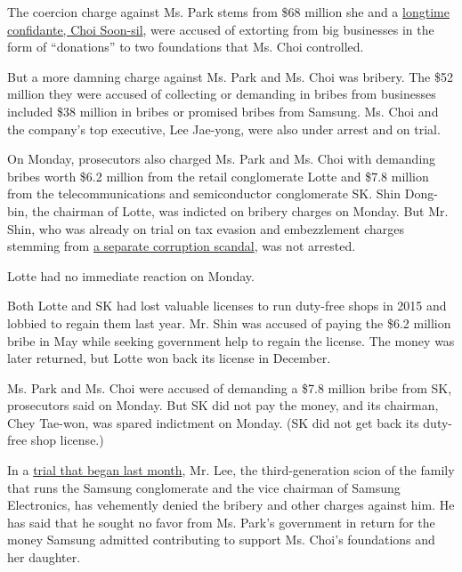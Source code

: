 The coercion charge against Ms. Park stems from \$68 million she and a
\href{https://www.nytimes3xbfgragh.onion/2016/11/06/world/asia/south-koreans-ashamed-over-les-secretive-adviser.html}{longtime
confidante, Choi Soon-sil}, were accused of extorting from big
businesses in the form of ``donations'' to two foundations that Ms. Choi
controlled.

But a more damning charge against Ms. Park and Ms. Choi was bribery. The
\$52 million they were accused of collecting or demanding in bribes from
businesses included \$38 million in bribes or promised bribes from
Samsung. Ms. Choi and the company's top executive, Lee Jae-yong, were
also under arrest and on trial.

On Monday, prosecutors also charged Ms. Park and Ms. Choi with demanding
bribes worth \$6.2 million from the retail conglomerate Lotte and \$7.8
million from the telecommunications and semiconductor conglomerate SK.
Shin Dong-bin, the chairman of Lotte, was indicted on bribery charges on
Monday. But Mr. Shin, who was already on trial on tax evasion and
embezzlement charges stemming from
\href{https://www.nytimes3xbfgragh.onion/2016/10/20/business/international/south-korea-lotte-chaebol-conglomerate-indicted.html}{a
separate corruption scandal}, was not arrested.

Lotte had no immediate reaction on Monday.

Both Lotte and SK had lost valuable licenses to run duty-free shops in
2015 and lobbied to regain them last year. Mr. Shin was accused of
paying the \$6.2 million bribe in May while seeking government help to
regain the license. The money was later returned, but Lotte won back its
license in December.

Ms. Park and Ms. Choi were accused of demanding a \$7.8 million bribe
from SK, prosecutors said on Monday. But SK did not pay the money, and
its chairman, Chey Tae-won, was spared indictment on Monday. (SK did not
get back its duty-free shop license.)

In a
\href{https://www.nytimes3xbfgragh.onion/2017/03/09/business/jay-y-lee-samsung-trial.html}{trial
that began last month}, Mr. Lee, the third-generation scion of the
family that runs the Samsung conglomerate and the vice chairman of
Samsung Electronics, has vehemently denied the bribery and other charges
against him. He has said that he sought no favor from Ms. Park's
government in return for the money Samsung admitted contributing to
support Ms. Choi's foundations and her daughter.

